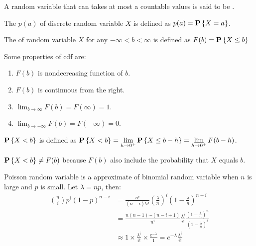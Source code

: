 \begin{definition}
    A random variable that can takes at most a countable values is said to be .
\end{definition}

\begin{definition}
    The  $p(a)$ of discrete random variable $X$ is defined as $p(a) = \mathop{\bf P\/}\displaystyle \left\{X = a\right\}$.
\end{definition}


\begin{definition}[cdf]
    The  of random variable $X$ for any $- \infty < b < \infty$ is defined as $F(b) = \mathop{\bf P\/}\displaystyle \left\{ X \leq b \right\}$
\end{definition}

\begin{theorem}
    Some properties of cdf are:
    \begin{enumerate}
        \item $F(b)$ is nondecreasing function of $b$.
        \item $F(b)$ is continuous from the right.
        \item $\displaystyle \lim_{b \rightarrow \infty} F(b) = F(\infty) = 1$.
        \item $\displaystyle \lim_{b \rightarrow -\infty} F(b) = F(- \infty) = 0$.
    \end{enumerate}
\end{theorem}

\begin{definition}
    $\mathop{\bf P\/}\displaystyle \left\{X < b\right\}$ is defined as $\mathop{\bf P\/}\displaystyle \left\{ X < b \right\} = \displaystyle \lim_{h \rightarrow 0^+} \mathop{\bf P\/}\displaystyle \left\{ X \leq b - h \right\} = \lim_{h \rightarrow 0^+} F(b-h)$.
\end{definition}

$\mathop{\bf P\/}\displaystyle \left\{X < b\right\} \neq F(b)$ because $F(b)$ also include the probability that $X$ equals $b$.




Poisson random variable is a approximate of binomial random variable when $n$ is large and $p$ is small. Let $\lambda = np$, then:
\begin{equation*}
    \begin{aligned}
        \binom{n}{i}p^i (1-p)^{n-i} &= \frac{n!}{(n-i)! i!} \left(\frac{\lambda}{n} \right)^i \left(1-\frac{\lambda}{n} \right)^{n-i} \\
        &= \frac{n (n-1) \cdots (n - i + 1)}{n^i} \frac{\lambda^i}{i!} \frac{(1- \frac{\lambda}{n})^n}{(1- \frac{\lambda}{n})^i} \\
        & \approx 1 \times \frac{\lambda^i}{i!} \times \frac{e^{- \lambda}}{1} = e^{- \lambda} \frac{\lambda^i}{ i !}
    \end{aligned}
\end{equation*}

